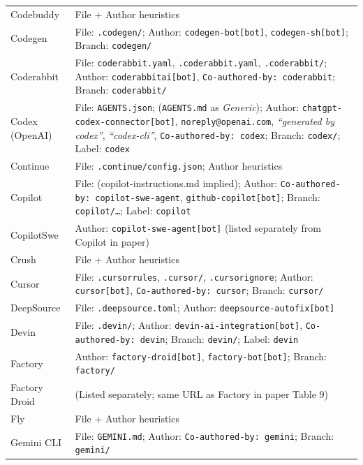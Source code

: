 \documentclass[10pt,a4paper]{article}
\begin{document}
\begin{longtable}{L{3cm}L{10.5cm}}
Codebuddy        & File + Author heuristics \\
Codegen          & File: \texttt{.codegen/}; Author: \texttt{codegen-bot[bot]}, \texttt{codegen-sh[bot]}; Branch: \texttt{codegen/} \\
Coderabbit       & File: \texttt{coderabbit.yaml}, \texttt{.coderabbit.yaml}, \texttt{.coderabbit/}; Author: \texttt{coderabbitai[bot]}, \texttt{Co-authored-by: coderabbit}; Branch: \texttt{coderabbit/} \\
Codex (OpenAI)   & File: \texttt{AGENTS.json}; (\texttt{AGENTS.md} as \emph{Generic}); Author: \texttt{chatgpt-codex-connector[bot]}, \texttt{noreply@openai.com}, \textit{``generated by codex''}, \textit{``codex-cli''}, \texttt{Co-authored-by: codex}; Branch: \texttt{codex/}; Label: \texttt{codex} \\
Continue         & File: \texttt{.continue/config.json}; Author heuristics \\
Copilot          & File: (copilot-instructions.md implied); Author: \texttt{Co-authored-by: copilot-swe-agent}, \texttt{github-copilot[bot]}; Branch: \texttt{copilot/\ldots}; Label: \texttt{copilot} \\
CopilotSwe       & Author: \texttt{copilot-swe-agent[bot]} (listed separately from Copilot in paper) \\
Crush            & File + Author heuristics \\
Cursor           & File: \texttt{.cursorrules}, \texttt{.cursor/}, \texttt{.cursorignore}; Author: \texttt{cursor[bot]}, \texttt{Co-authored-by: cursor}; Branch: \texttt{cursor/} \\
DeepSource       & File: \texttt{.deepsource.toml}; Author: \texttt{deepsource-autofix[bot]} \\
Devin            & File: \texttt{.devin/}; Author: \texttt{devin-ai-integration[bot]}, \texttt{Co-authored-by: devin}; Branch: \texttt{devin/}; Label: \texttt{devin} \\
Factory          & Author: \texttt{factory-droid[bot]}, \texttt{factory-bot[bot]}; Branch: \texttt{factory/} \\
Factory Droid    & (Listed separately; same URL as Factory in paper Table 9) \\
Fly              & File + Author heuristics \\
Gemini CLI       & File: \texttt{GEMINI.md}; Author: \texttt{Co-authored-by: gemini}; Branch: \texttt{gemini/} \\

\end{longtable}
\end{document}
